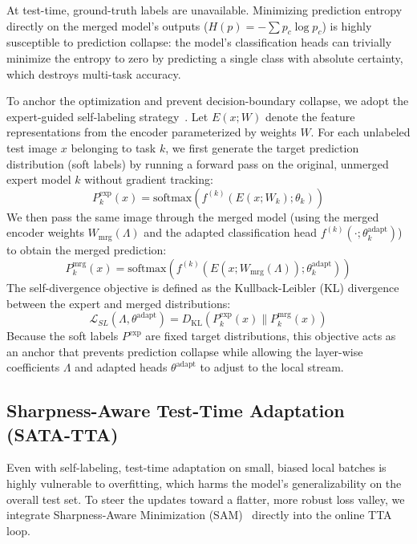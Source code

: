 \documentclass{article}
\theoremstyle{plain}
\theoremstyle{definition}
\theoremstyle{remark}
\begin{document}
At test-time, ground-truth labels are unavailable. Minimizing prediction entropy directly on the merged model's outputs ($H(p) = -\sum p_c \log p_c$) is highly susceptible to prediction collapse: the model's classification heads can trivially minimize the entropy to zero by predicting a single class with absolute certainty, which destroys multi-task accuracy.

To anchor the optimization and prevent decision-boundary collapse, we adopt the expert-guided self-labeling strategy~\cite{jung2025symerge}. Let $E(x; W)$ denote the feature representations from the encoder parameterized by weights $W$. For each unlabeled test image $x$ belonging to task $k$, we first generate the target prediction distribution (soft labels) by running a forward pass on the original, unmerged expert model $k$ without gradient tracking:
\begin{equation}
  P^{\text{exp}}_k(x) = \text{softmax}(f^{(k)}(E(x; W_k); \theta_k))
\end{equation}
We then pass the same image through the merged model (using the merged encoder weights $W_{\text{mrg}}(\Lambda)$ and the adapted classification head $f^{(k)}(\cdot; \theta_k^{\text{adapt}})$) to obtain the merged prediction:
\begin{equation}
  P^{\text{mrg}}_k(x) = \text{softmax}(f^{(k)}(E(x; W_{\text{mrg}}(\Lambda)); \theta_k^{\text{adapt}}))
\end{equation}
The self-divergence objective is defined as the Kullback-Leibler (KL) divergence between the expert and merged distributions:
\begin{equation}
  \mathcal{L}_{SL}(\Lambda, \theta^{\text{adapt}}) = D_{\text{KL}}(P^{\text{exp}}_k(x) \parallel P^{\text{mrg}}_k(x))
\end{equation}
Because the soft labels $P^{\text{exp}}$ are fixed target distributions, this objective acts as an anchor that prevents prediction collapse while allowing the layer-wise coefficients $\Lambda$ and adapted heads $\theta^{\text{adapt}}$ to adjust to the local stream.

\subsection{Sharpness-Aware Test-Time Adaptation (SATA-TTA)}

Even with self-labeling, test-time adaptation on small, biased local batches is highly vulnerable to overfitting, which harms the model's generalizability on the overall test set. To steer the updates toward a flatter, more robust loss valley, we integrate Sharpness-Aware Minimization (SAM)~\cite{foret2020sharpness} directly into the online TTA loop.
\end{document}
